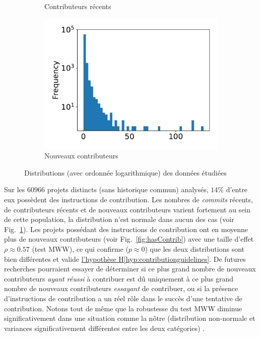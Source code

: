 \documentclass[dvipsnames,runningheads]{llncs}
\newcommand{\en}[1]{\foreignlanguage{english}{\emph{#1}}}
\begin{document}
\begin{figure}
\begin{subfigure}[t]{0.333\textwidth}
            \caption{Contributeurs récents}
        \end{subfigure}%
        \begin{subfigure}[t]{0.333\textwidth}
            \includegraphics[width=\textwidth]{../experiment/data_analysis/newContributorCount_distribution}
            \caption{Nouveaux contributeurs}
        \end{subfigure}
        \caption{Distributions (avec ordonnée logarithmique) des données étudiées}
        \label{fig:distribution}
    \end{figure}

    Sur les $60 966$ projets distincts (sans historique commun) analysés, $14\%$ d'entre eux possèdent des
    instructions de contribution. Les nombres de \en{commits} récents, de contributeurs récents et de nouveaux
    contributeurs varient fortement au sein de cette population, la distribution n'est normale dans aucun des
    cas (voir Fig.~\ref{fig:distribution}). Les projets possédant des instructions de contribution ont en
    moyenne plus de nouveaux contributeurs (voir Fig.~\ref{fig:hasContrib}) avec une taille d'effet $\rho
    \approx 0.57$ (test MWW), ce qui confirme ($p \approx 0$) que les deux distributions sont bien différentes
    et valide \hyperref[hyp:contributionguidelines]{l'hypothèse H\ref*{hyp:contributionguidelines}}. De
    futures recherches pourraient essayer de déterminer si ce plus grand nombre de nouveaux contributeurs
    \emph{ayant réussi} à contribuer est dû uniquement à ce plus grand nombre de nouveaux contributeurs
    \emph{essayant} de contribuer, ou si la présence d'instructions de contribution a un réel rôle dans le
    succès d'une tentative de contribution. Notons tout de même que la robustesse du test MWW diminue
    significativement dans une situation comme la nôtre (distribution non-normale et variances
    significativement différentes entre les deux catégories) \parencite{WMW-robustness-1998}.
\end{document}

